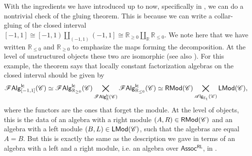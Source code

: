 \documentclass[../text]{subfiles}
\begin{document}
\begin{example}\label{ex:reproduce_lcfas_on_interval}
    With the ingredients we have introduced up to now, specifically in , we can do a nontrivial check of the gluing theorem. This is because we can write a collar-gluing of the closed interval $[-1,1] \cong \left[-1,1\right) \coprod_{(-1,1)} \left(-1,1\right] \cong \mathbb{R}_{\geq 0} \coprod_{\mathbb{R}} \mathbb{R}_{\leq 0}$. We note here that we have written $\mathbb{R}_{\leq 0}$ and $\mathbb{R}_{\geq 0}$ to emphasize the maps forming the decomposition. At the level of unstructured objects these two are isomorphic (see also ). For this example, the theorem says that locally constant factorization algebras on the closed interval should be given by
    \begin{equation}
        \mathscr{F} \mathsf{Alg}^{\mathsf{lc}}_{[-1,1]} (\mathscr{C}) \simeq \mathscr{F} \mathsf{Alg}^{\mathsf{lc}}_{\mathbb{R}_{\geq 0}} (\mathscr{C}) \bigtimes_{\mathscr{F} \mathsf{Alg}^{\mathsf{lc}}_{\mathbb{R}} (\mathscr{C})} \mathscr{F} \mathsf{Alg}^{\mathsf{lc}}_{\mathbb{R}_{\leq 0}} (\mathscr{C}) \simeq \mathsf{RMod} (\mathscr{C}) \bigtimes_{\mathscr{A} \mathsf{lg}_{\mathbb{E}_1} (\mathscr{C})} \mathsf{LMod} (\mathscr{C}),
    \end{equation}
    where the functors are the ones that forget the module. At the level of objects, this is the data of an algebra with a right module $(A, R) \in \mathsf{RMod} (\mathscr{C})$ and an algebra with a left module $(B, L) \in \mathsf{LMod} (\mathscr{C})$, such that the algebras are equal $A = B$. But this is exactly the same as the description we gave in terms of an algebra with a left and a right module, i.e. an algebra over $\mathsf{Assoc^{RL}}$, in .
\end{example}
\end{document}
